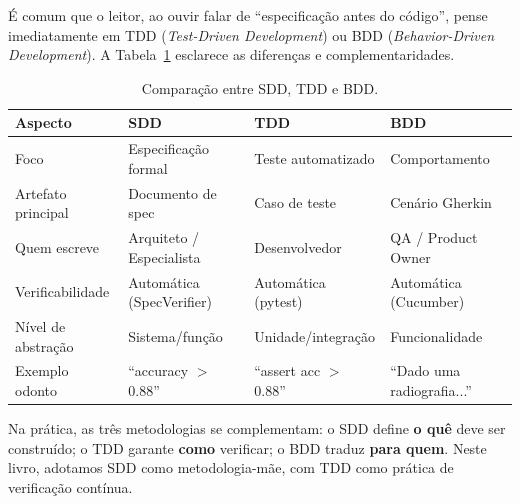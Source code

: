 É comum que o leitor, ao ouvir falar de ``especificação antes do código'',
pense imediatamente em TDD (\textit{Test-Driven Development}) ou BDD
(\textit{Behavior-Driven Development}). A Tabela~\ref{tab:sdd-tdd-bdd}
esclarece as diferenças e complementaridades.

\begin{table}[H]
  \centering
  \caption{Comparação entre SDD, TDD e BDD.}
  \label{tab:sdd-tdd-bdd}
  \begin{tabularx}{\textwidth}{lXXX}
    \toprule
    \textbf{Aspecto} & \textbf{SDD} & \textbf{TDD} & \textbf{BDD} \\
    \midrule
    Foco & Especificação formal & Teste automatizado & Comportamento \\
    Artefato principal & Documento de spec & Caso de teste & Cenário Gherkin \\
    Quem escreve & Arquiteto / Especialista & Desenvolvedor & QA / Product Owner \\
    Verificabilidade & Automática (SpecVerifier) & Automática (pytest) & Automática (Cucumber) \\
    Nível de abstração & Sistema/função & Unidade/integração & Funcionalidade \\
    Exemplo odonto & ``accuracy $>$ 0.88'' & ``assert acc $>$ 0.88'' & ``Dado uma radiografia...'' \\
    \bottomrule
  \end{tabularx}
\end{table}

Na prática, as três metodologias se complementam: o SDD define \textbf{o quê}
deve ser construído; o TDD garante \textbf{como} verificar; o BDD traduz
\textbf{para quem}. Neste livro, adotamos SDD como metodologia-mãe, com
TDD como prática de verificação contínua.


